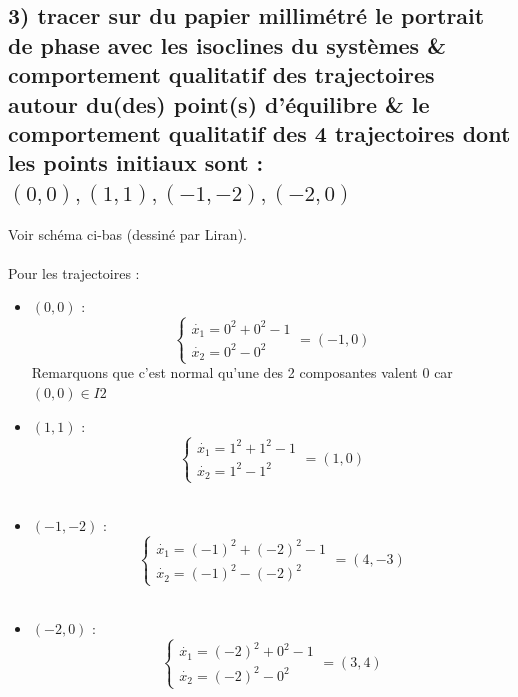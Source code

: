 \documentclass[11pt,a4paper]{report}
\begin{document}
		\subsection*{3) tracer sur du papier millimétré le portrait de phase avec les isoclines du systèmes \& comportement qualitatif des trajectoires autour du(des) point(s) d'équilibre \& le comportement qualitatif des 4 trajectoires dont les points initiaux sont : $(0,0) , (1,1), (-1, -2), (-2,0)$}
		
			Voir schéma ci-bas (dessiné par Liran).\\ \\
			Pour les trajectoires :
			\begin{itemize}
				\item $(0,0)$ : 
					\[
					\begin{cases} 
						\dot{x_1} = 0^2 + 0^2 -1 \\ 
						\dot{x_2} = 0^2 - 0^2
					\end{cases}
					= (-1,0)
					\]
					Remarquons que c'est normal qu'une des 2 composantes valent 0 car $(0,0) \in I2$\\
				
				\item $(1,1)$ : 
					\[
					\begin{cases} 
						\dot{x_1} = 1^2 + 1^2 -1 \\ 
						\dot{x_2} = 1^2 - 1^2
					\end{cases}
					= (1,0)
					\] \\
				
				\item $(-1,-2)$ : 
					\[
					\begin{cases} 
						\dot{x_1} = (-1)^2 + (-2)^2 -1 \\ 
						\dot{x_2} = (-1)^2 - (-2)^2
					\end{cases}
					= (4, -3)
					\] \\
					
				\item $(-2,0)$ : 
					\[
					\begin{cases} 
						\dot{x_1} = (-2)^2 + 0^2 -1 \\ 
						\dot{x_2} = (-2)^2 - 0^2
					\end{cases}
					= (3, 4)
					\] \\
			\end{itemize}
			
\end{document}
